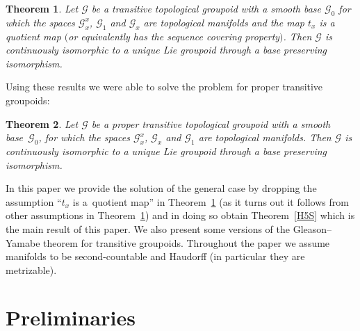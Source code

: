 \documentclass[pdftex]{sigma}
\newtheorem{tw}{Theorem}[section]
\begin{document}
\begin{tw}\label{SE} Let $\mathcal{G}$ be a transitive topological groupoid with a smooth base $\mathcal{G}_0$ for which the spaces $\mathcal{G}_x^x$, $\mathcal{G}_1$ and $\mathcal{G}_x$ are topological manifolds and the map $t_x$ is a quotient map $($or equivalently has the sequence covering property$)$. Then $\mathcal{G}$ is continuously isomorphic to a unique Lie groupoid through a base preserving isomorphism.
\end{tw}
Using these results we were able to solve the problem for proper transitive groupoids:
\begin{tw}\label{prop} Let $\mathcal{G}$ be a proper transitive topological groupoid with a smooth base~$\mathcal{G}_0$, for which the spaces $\mathcal{G}_x^x$, $\mathcal{G}_x$ and $\mathcal{G}_1$ are topological manifolds. Then $\mathcal{G}$ is continuously isomorphic to a unique Lie groupoid through a base preserving isomorphism.
\end{tw}

In this paper we provide the solution of the general case by dropping the assumption ``$t_x$ is a~quotient map'' in Theorem~\ref{SE} (as it turns out it follows from other assumptions in Theorem~\ref{SE}) and in doing so obtain Theorem~\ref{H5S} which is the main result of this paper. We also present some versions of the Gleason--Yamabe theorem for transitive groupoids. Throughout the paper we assume manifolds to be second-countable and Haudorff (in particular they are metrizable).

\section{Preliminaries}
\end{document}
